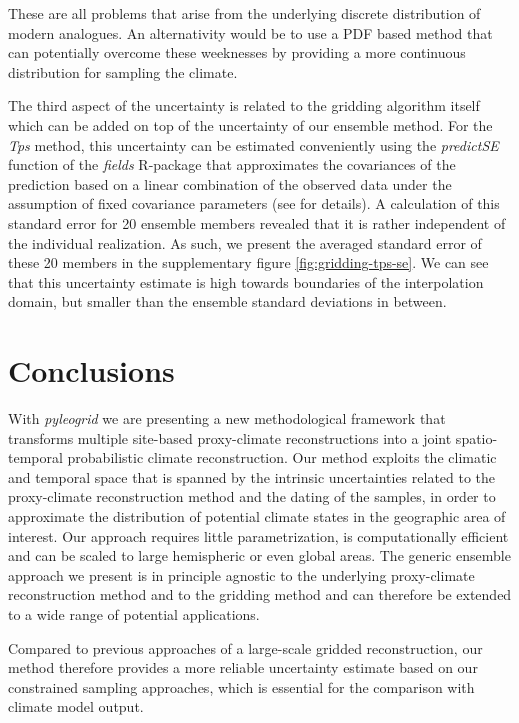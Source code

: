 \begin{refsection}
These are all problems that arise from the underlying discrete distribution of modern analogues. An alternativity would be to use a PDF based method \citep[for instance]{ChevalierCheddadiChase2014, Chevalier2019} that can potentially overcome these weeknesses by providing a more continuous distribution for sampling the climate.

The third aspect of the uncertainty is related to the gridding algorithm itself which can be added on top of the uncertainty of our ensemble method. For the \textit{Tps} method, this uncertainty can be estimated conveniently using the \textit{predictSE} function of the \textit{fields} R-package that approximates the covariances of the prediction based on a linear combination of the observed data under the assumption of fixed covariance parameters (see \cite{NychkaFurrerPaigeEtAl2017} for details). A calculation of this standard error for 20 ensemble members revealed that it is rather independent of the individual realization. As such, we present the averaged standard error of these 20 members in the supplementary figure \ref{fig:gridding-tps-se}. We can see that this uncertainty estimate is high towards boundaries of the interpolation domain, but smaller than the ensemble standard deviations in between.


\section{Conclusions}  \label{sec:gridding-conclusions}
With \textit{pyleogrid} we are presenting a new methodological framework that transforms multiple site-based proxy-climate reconstructions into a joint spatio-temporal probabilistic climate reconstruction. Our method exploits the climatic and temporal space that is spanned by the intrinsic uncertainties related to the proxy-climate reconstruction method and the dating of the samples, in order to approximate the distribution of potential climate states in the geographic area of interest. Our approach requires little parametrization, is computationally efficient and can be scaled to large hemispheric or even global areas. The generic ensemble approach we present is in principle agnostic to the underlying proxy-climate reconstruction method and to the gridding method and can therefore be extended to a wide range of potential applications.

Compared to previous approaches of a large-scale gridded reconstruction, our method therefore provides a more reliable uncertainty estimate based on our constrained sampling approaches, which is essential for the comparison with climate model output. 


\end{refsection}
